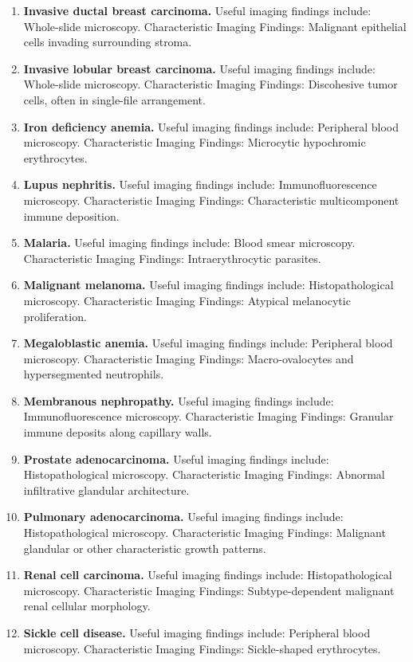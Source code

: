 \begin{enumerate}[leftmargin=*,itemsep=0.45em,topsep=0.4em]
\item \textbf{Invasive ductal breast carcinoma.} Useful imaging findings include: Whole-slide microscopy. Characteristic Imaging Findings: Malignant epithelial cells invading surrounding stroma.
\item \textbf{Invasive lobular breast carcinoma.} Useful imaging findings include: Whole-slide microscopy. Characteristic Imaging Findings: Discohesive tumor cells, often in single-file arrangement.
\item \textbf{Iron deficiency anemia.} Useful imaging findings include: Peripheral blood microscopy. Characteristic Imaging Findings: Microcytic hypochromic erythrocytes.
\item \textbf{Lupus nephritis.} Useful imaging findings include: Immunofluorescence microscopy. Characteristic Imaging Findings: Characteristic multicomponent immune deposition.
\item \textbf{Malaria.} Useful imaging findings include: Blood smear microscopy. Characteristic Imaging Findings: Intraerythrocytic parasites.
\item \textbf{Malignant melanoma.} Useful imaging findings include: Histopathological microscopy. Characteristic Imaging Findings: Atypical melanocytic proliferation.
\item \textbf{Megaloblastic anemia.} Useful imaging findings include: Peripheral blood microscopy. Characteristic Imaging Findings: Macro-ovalocytes and hypersegmented neutrophils.
\item \textbf{Membranous nephropathy.} Useful imaging findings include: Immunofluorescence microscopy. Characteristic Imaging Findings: Granular immune deposits along capillary walls.
\item \textbf{Prostate adenocarcinoma.} Useful imaging findings include: Histopathological microscopy. Characteristic Imaging Findings: Abnormal infiltrative glandular architecture.
\item \textbf{Pulmonary adenocarcinoma.} Useful imaging findings include: Histopathological microscopy. Characteristic Imaging Findings: Malignant glandular or other characteristic growth patterns.
\item \textbf{Renal cell carcinoma.} Useful imaging findings include: Histopathological microscopy. Characteristic Imaging Findings: Subtype-dependent malignant renal cellular morphology.
\item \textbf{Sickle cell disease.} Useful imaging findings include: Peripheral blood microscopy. Characteristic Imaging Findings: Sickle-shaped erythrocytes.

\end{enumerate}
